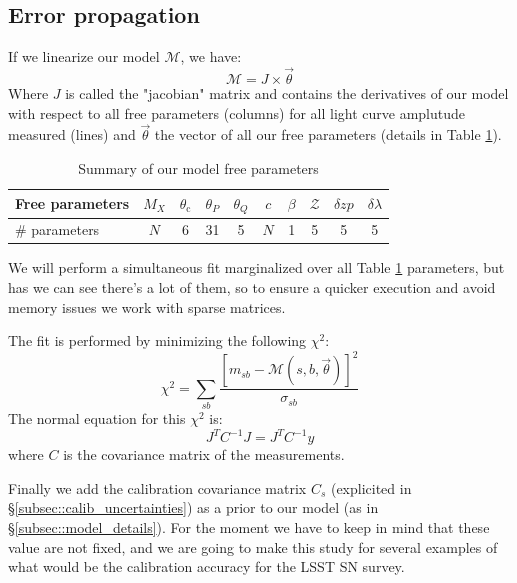 \documentclass[\docopts]{\docclass}
\begin{document}

\subsection{Error propagation}
\label{sec::linalg}

If we linearize our model $\mathcal{M}$, we have:
\begin{equation}
\mathcal{M} = J \times \vec\theta
\end{equation}
Where $J$ is called the "jacobian" matrix and contains the derivatives of our model with respect to all free parameters (columns) for all light curve amplutude measured (lines) and $\vec\theta$ the vector of all our free parameters (details in Table \ref{tab:params}).

\begin{table}[t]
\begin{center}
\label{tab:params}
\caption{Summary of our model free parameters}
\begin{tabular}{l|ccccccccc}
\hline
\hline
Free parameters & $M_X$ & $\theta_\text{c}$ & $\theta_P$ & $\theta_Q$ & $c$ & $\beta$ & $\mathcal{Z}$ & $\delta zp$ & $\delta \lambda$ \\
\hline
\# parameters & $N$ & 6 & 31 & 5 & $N$ & 1 & 5 & 5 & 5 \\
\hline
\end{tabular}
\end{center}
\end{table}


We will perform a simultaneous fit marginalized over all Table \ref{tab:params} parameters, but has we can see there's a lot of them, so to ensure a quicker execution and avoid memory issues we work with sparse matrices.

The fit is performed by minimizing the following $\chi^2$:
\begin{equation}
\chi^2 = \sum_{sb}\frac{[m_{sb} - \mathcal{M}(s, b, \vec\theta)]^2}{\sigma_{sb}}
\end{equation}
The normal equation for this $\chi^2$ is:
\begin{equation}
J^TC^{-1}J = J^TC^{-1}y
\end{equation}
where $C$ is the covariance matrix of the measurements.

Finally we add the calibration covariance matrix $C_s$ (explicited in §\ref{subsec::calib_uncertainties}) as a prior to our model (as in §\ref{subsec::model_details}).
For the moment we have to keep in mind that these value are not fixed, and we are going to make this study for several examples of what would be the calibration accuracy for the LSST SN survey.
\end{document}
